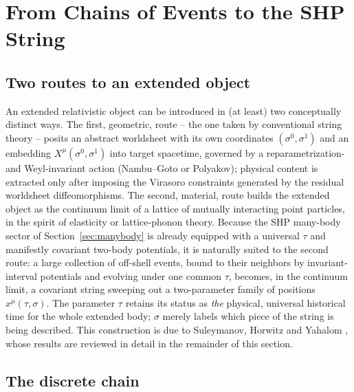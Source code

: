 \documentclass[11pt]{article}
\begin{document}
\section{From Chains of Events to the SHP String}
\label{sec:string}

\subsection{Two routes to an extended object}

An extended relativistic object can be introduced in (at least) two
conceptually distinct ways. The first, geometric, route -- the one taken by
conventional string theory -- posits an abstract worldsheet with its own
coordinates $(\sigma^0,\sigma^1)$ and an embedding $X^\mu(\sigma^0,\sigma^1)$
into target spacetime, governed by a reparametrization- and Weyl-invariant
action (Nambu--Goto or Polyakov); physical content is extracted only after
imposing the Virasoro constraints generated by the residual worldsheet
diffeomorphisms. The second, material, route builds the extended object as the
continuum limit of a lattice of mutually interacting point particles, in the
spirit of elasticity or lattice-phonon theory. Because the SHP many-body sector
of Section~\ref{sec:manybody} is already equipped with a universal $\tau$ and
manifestly covariant two-body potentials, it is naturally suited to the second
route: a large collection of off-shell events, bound to their neighbors by
invariant-interval potentials and evolving under one common $\tau$, becomes,
in the continuum limit, a covariant string sweeping out a two-parameter family
of positions $x^\mu(\tau,\sigma)$. The parameter $\tau$ retains its status as
\emph{the} physical, universal historical time for the whole extended body;
$\sigma$ merely labels which piece of the string is being described. This
construction is due to Suleymanov, Horwitz and Yahalom
\cite{SuleymanovHorwitzYahalom2017}, whose results are reviewed in detail in
the remainder of this section.

\subsection{The discrete chain}
\label{sec:discretechain}
\end{document}
